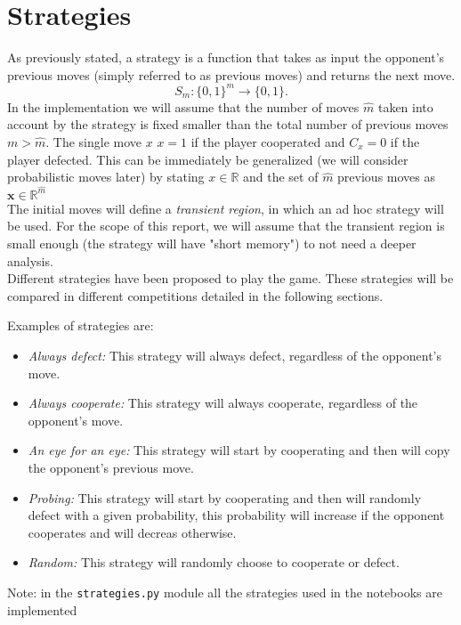 \documentclass{article}
\begin{document}
\section{Strategies}
As previously stated, a strategy is a function that takes as input the opponent's previous moves (simply referred to as previous moves) and returns the next move.
\begin{equation}
    S_m: \{0,1\}^m \rightarrow \{0,1\}.
\end{equation} 
In the implementation we will assume that the number of moves $\hat{m}$ taken into account by the strategy is fixed smaller than the total number of previous moves $m>\hat{m}$. The single move $x$ $x = 1$ if the player cooperated and $C_x = 0$ if the player defected. This can be immediately be generalized (we will consider probabilistic moves later) by stating $x \in \mathbb{R}$ and the set of $\hat{m}$ previous moves as $\mathbf{x} \in \mathbb{R}^{\hat{m}}$ \\
The initial moves will define a \textit{transient region}, in which an ad hoc strategy will be used. For the scope of this report, we will assume that the transient region is small enough (the strategy will have "short memory") to not need a deeper analysis. \\ 

Different strategies have been proposed to play the game. These strategies will be compared in different competitions detailed in the following sections.

Examples of strategies are:
\begin{itemize}
    \item \textit{Always defect:} This strategy will always defect, regardless of the opponent's move.
    \item \textit{Always cooperate:} This strategy will always cooperate, regardless of the opponent's move.
    \item \textit{An eye for an eye:} This strategy will start by cooperating and then will copy the opponent's previous move.
    \item \textit{Probing:} This strategy will start by cooperating and then will randomly defect with a given probability, this probability will increase if the opponent cooperates and will decreas otherwise.
    \item \textit{Random:} This strategy will randomly choose to cooperate or defect.
\end{itemize}
Note: in the \texttt{strategies.py} module all the strategies used in the notebooks are implemented
\end{document}
